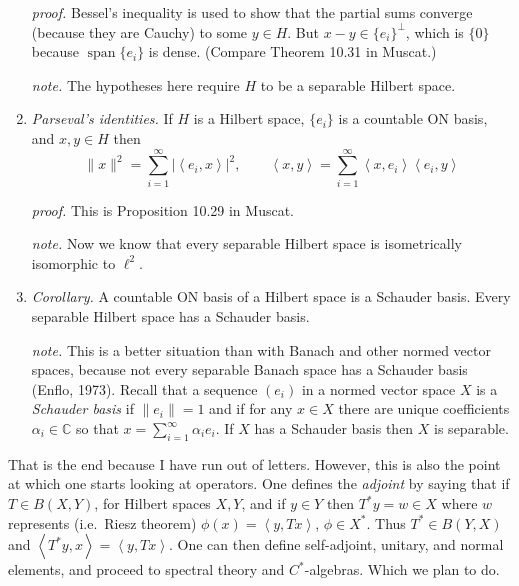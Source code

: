 \documentclass[11pt]{article}
\newcommand{\CC}{\mathbb{C}}
\newcommand{\ip}[2]{\ensuremath{\left<#1,#2\right>}}
\begin{document}
\begin{enumerate}
\emph{proof.}  Bessel's inequality is used to show that the partial sums converge (because they are Cauchy) to some $y \in H$.  But $x-y \in \{e_i\}^\perp$, which is $\{0\}$ because $\operatorname{span} \{e_i\}$ is dense.  (Compare Theorem 10.31 in Muscat.)

\emph{note.}  The hypotheses here require $H$ to be a separable Hilbert space.

\item \emph{Parseval's identities.}  If $H$ is a Hilbert space, $\{e_i\}$ is a countable ON basis, and $x,y\in H$ then
    $$\|x\|^2 = \sum_{i=1}^\infty |\ip{e_i}{x}|^2, \qquad \ip{x}{y} = \sum_{i=1}^\infty \ip{x}{e_i} \ip{e_i}{y}$$

\emph{proof.}  This is Proposition 10.29 in Muscat.

\emph{note.}  Now we know that every separable Hilbert space is isometrically isomorphic to $\ell^2$.

\item \emph{Corollary.}  A countable ON basis of a Hilbert space is a Schauder basis.  Every separable Hilbert space has a Schauder basis.

\emph{note.}  This is a better situation than with Banach and other normed vector spaces, because not every separable Banach space has a Schauder basis (Enflo, 1973).  Recall that a sequence $(e_i)$ in a normed vector space $X$ is a \emph{Schauder basis} if $\|e_i\|=1$ and if for any $x\in X$ there are unique coefficients $\alpha_i \in \CC$ so that $x=\sum_{i=1}^\infty \alpha_i e_i$.  If $X$ has a Schauder basis then $X$ is separable.
\end{enumerate}

That is the end because I have run out of letters.  However, this is also the point at which one starts looking at operators.  One defines the \emph{adjoint} by saying that if $T\in B(X,Y)$, for Hilbert spaces $X,Y$, and if $y\in Y$ then $T^*y=w \in X$ where $w$ represents (i.e.~Riesz theorem) $\phi(x) = \ip{y}{Tx}$, $\phi\in X^*$.  Thus $T^*\in B(Y,X)$ and $\ip{T^*y}{x} = \ip{y}{Tx}$.  One can then define self-adjoint, unitary, and normal elements, and proceed to spectral theory and $C^*$-algebras.  Which we plan to do.
\end{document}
